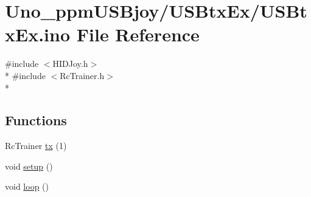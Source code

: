 \hypertarget{USBtxEx_8ino}{\section{Uno\-\_\-ppm\-U\-S\-Bjoy/\-U\-S\-Btx\-Ex/\-U\-S\-Btx\-Ex.ino File Reference}
\label{USBtxEx_8ino}
}
{\ttfamily \#include $<$H\-I\-D\-Joy.\-h$>$}\\*
{\ttfamily \#include $<$Rc\-Trainer.\-h$>$}\\*
\subsection*{Functions}
\begin{DoxyCompactItemize}
\item 
Rc\-Trainer \hyperlink{USBtxEx_8ino_a936a44d3f93ba7d2286b7bbb37a41ca8}{tx} (1)
\item 
void \hyperlink{USBtxEx_8ino_a4fc01d736fe50cf5b977f755b675f11d}{setup} ()
\item 
void \hyperlink{USBtxEx_8ino_afe461d27b9c48d5921c00d521181f12f}{loop} ()
\end{DoxyCompactItemize}
